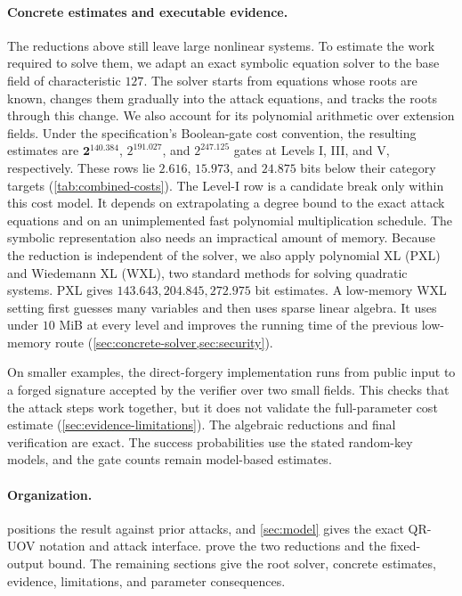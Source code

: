 \documentclass[11pt,a4paper]{article}
\theoremstyle{definition}
\theoremstyle{remark}
\begin{document}
\paragraph{Concrete estimates and executable evidence.}
The reductions above still leave large nonlinear systems.  To estimate the
work required to solve them, we adapt an exact symbolic equation solver to
the base field of characteristic $127$.  The solver starts from equations
whose roots are known, changes them gradually into the attack equations, and
tracks the roots through this change.  We also account for its polynomial
arithmetic over extension fields.  Under the specification's Boolean-gate
cost convention, the resulting estimates are
$\mathbf{2^{140.384}}$, $2^{191.027}$, and $2^{247.125}$ gates at Levels I,
III, and V, respectively.  These rows lie $2.616$, $15.973$, and $24.875$ bits
below their category targets (\cref{tab:combined-costs}).  The Level-I row is a
candidate break only within this cost model.  It depends on extrapolating a
degree bound to the exact attack equations and on an unimplemented fast
polynomial multiplication schedule.  The symbolic representation also needs
an impractical amount of memory.  Because the reduction is independent of the
solver, we also apply polynomial XL (PXL) and Wiedemann XL (WXL), two standard
methods for solving quadratic systems.  PXL gives
$143.643,204.845,272.975$ bit estimates.  A low-memory WXL setting first
guesses many variables and then uses sparse linear algebra.  It uses under
$10$ MiB at every level and improves the running time of the previous
low-memory route (\cref{sec:concrete-solver,sec:security}).

On smaller examples, the direct-forgery implementation runs from public input
to a forged signature accepted by the verifier over two small fields.  This
checks that the attack steps work together, but it does not validate the
full-parameter cost estimate (\cref{sec:evidence-limitations}).  The algebraic
reductions and final verification are exact.  The success probabilities use
the stated random-key models, and the gate counts remain model-based
estimates.

\paragraph{Organization.}
 positions the result against prior attacks, and
\cref{sec:model} gives the exact QR-UOV notation and attack interface.
 prove the two reductions and the fixed-output
bound.  The remaining sections give the root solver, concrete estimates,
evidence, limitations, and parameter consequences.
\end{document}

